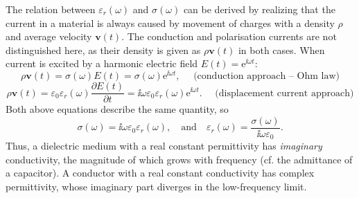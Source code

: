 The relation between $\varepsilon_r(\omega)$ and $\sigma(\omega)$
 can be derived by realizing that the current in a material is always caused by movement of charges with a density $\rho$ and average velocity $\mathbf{v}(t)$. The conduction and polarisation currents are not distinguished here, as their density is given as $\rho \mathbf{v}(t)$ in both cases. When current is excited by a harmonic electric field $E(t) = \mathrm{e}^{\ii\omega t}$: %
\begin{equation} \rho \mathbf{v}(t) = \sigma(\omega) E(t) = \sigma(\omega) \mathrm{e}^{\ii\omega t}, \quad\text{ (conduction approach -- Ohm law)} \label{eq_rho_n1}\end{equation}
\begin{equation} \rho \mathbf{v}(t) = \varepsilon_0 \varepsilon_r(\omega) \frac{\partial E(t)}{\partial t} = \ii \omega \varepsilon_0 \varepsilon_r(\omega) \mathrm{e}^{\ii\omega t} . \quad\text{ (displacement current approach)} \label{eq_rho_n2}\end{equation}
Both above equations describe the same quantity, so
\begin{equation} \sigma(\omega) = \ii \omega \varepsilon_0 \varepsilon_r(\omega), \quad  \text{and} \quad  \varepsilon_r(\omega)  = \frac{\sigma(\omega)}{\ii \omega \varepsilon_0}. \label{eq_drude_sigma}\end{equation}
Thus, a dielectric medium with a real constant permittivity has \textit{imaginary} conductivity, the magnitude of which grows with frequency (cf. the admittance of a capacitor). A conductor with a real constant conductivity has complex permittivity, whose imaginary part diverges in the low-frequency limit. 

